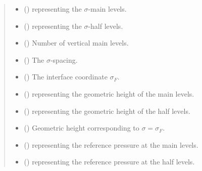 \documentclass[letterpaper,10pt,english]{sphinxmanual}
\begin{document}
\begin{fulllineitems}
\begin{quote}
\begin{description}
\begin{itemize}
\item {} 
 () \textendash{} {\hyperref[\detokenize{api:grids.axis.Axis}]{}} representing the \(\sigma\)-main levels.

\item {} 
 () \textendash{} {\hyperref[\detokenize{api:grids.axis.Axis}]{}} representing the \(\sigma\)-half levels.

\item {} 
 () \textendash{} Number of vertical main levels.

\item {} 
 () \textendash{} The \(\sigma\)-spacing.

\item {} 
 () \textendash{} The interface coordinate \(\sigma_F\).

\item {} 
 () \textendash{}  representing the geometric height of the main levels.

\item {} 
 () \textendash{}  representing the geometric height of the half levels.

\item {} 
 () \textendash{} Geometric height corresponding to \(\sigma = \sigma_F\).

\item {} 
 () \textendash{}  representing the reference pressure at the main levels.

\item {} 
 () \textendash{}  representing the reference pressure at the half levels.


\end{itemize}
\end{description}
\end{quote}
\end{fulllineitems}
\end{document}
